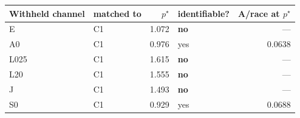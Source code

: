 \begin{tabular}{llrlr}
\toprule
Withheld channel & matched to & $p^\star$ & identifiable? & A/race at $p^\star$ \\
\midrule
E & C1 & 1.072 & \textbf{no} & --- \\
A0 & C1 & 0.976 & yes & 0.0638 \\
L025 & C1 & 1.615 & \textbf{no} & --- \\
L20 & C1 & 1.555 & \textbf{no} & --- \\
J & C1 & 1.493 & \textbf{no} & --- \\
S0 & C1 & 0.929 & yes & 0.0688 \\
\bottomrule
\end{tabular}
